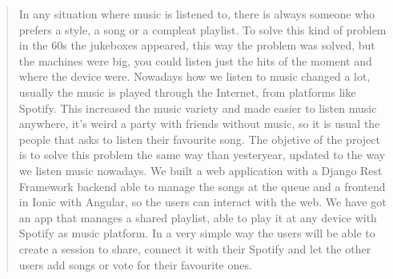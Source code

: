 \begin{abstract}
  \vspace*{25pt}
  \begin{segundoresumo}
	  In any situation where music is listened to, there is always someone who prefers a style, a song or a compleat playlist. To solve this kind of problem in the 60s the jukeboxes appeared, this way the problem was solved, but the machines were big, you could listen just the hits of the moment and where the device were. Nowadays how we listen to music changed a lot, usually the music is played through the Internet, from platforms like Spotify. This increased the music variety and made easier to listen music anywhere, it's weird a party with friends without music, so it is usual the people that asks to listen their favourite song.\smallbreak
	  The objetive of the project is to solve this problem the same way than yesteryear, updated to the way we listen music nowadays. We built a web application with a Django Rest Framework backend able to manage the songs at the queue and a frontend in Ionic with Angular, so the users can interact with the web.\smallbreak
	  We have got an app that manages a shared playlist, able to play it at any device with Spotify as music platform. In a very simple way the users will be able to create a session to share, connect it with their Spotify and let the other users add songs or vote for their favourite ones.
  \end{segundoresumo}
\vspace*{25pt}

\end{abstract}

